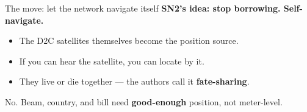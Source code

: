 \begin{frame}{The move: let the network navigate itself}
  \large\textbf{SN2's idea: stop borrowing. Self-navigate.}

  \vspace{0.5em}
  \small
  \begin{itemize}\itemsep5pt
    \item The D2C satellites themselves become the position source.
    \item If you can hear the satellite, you can locate by it.
    \item They live or die together --- the authors call it \textbf{fate-sharing}.
  \end{itemize}

     {No. Beam, country, and bill need \textbf{good-enough} position,
      not meter-level.}

\end{frame}

